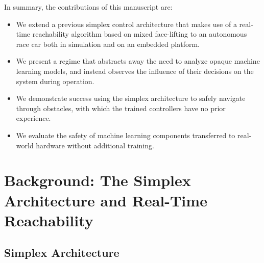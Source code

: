 \documentclass[manuscript,screen,review]{acmart}
\begin{document}
In summary, the contributions of this manuscript are: \raggedbottom
\begin{itemize}%
    \item We extend a previous simplex control architecture that makes use of a real-time reachability algorithm based on mixed face-lifting to an autonomous race car both in simulation and on an embedded platform.
    \item We present a regime that abstracts away the need to analyze opaque machine learning models, and instead observes the influence of their decisions on the system during operation.
    \item We demonstrate success using the simplex architecture to safely navigate through obstacles, with which the trained controllers have no prior experience.
    \item We evaluate the safety of machine learning components transferred to real-world hardware without additional training.
\end{itemize}%
\vspace{-1.5mm}


\section{Background: The Simplex Architecture and Real-Time Reachability}
\subsection{Simplex Architecture}

\end{document}
